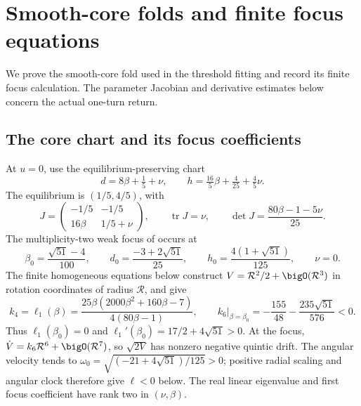 \section{Smooth-core folds and finite focus equations}
\label{app:harvesting-fold}

We prove the smooth-core fold used in the threshold fitting and record
its finite focus calculation. The parameter Jacobian and derivative
estimates below concern the actual one-turn return.

\subsection{The core chart and its focus coefficients}

At \(u=0\), use the equilibrium-preserving chart
\begin{equation}\label{eq:harvesting:core-chart}
 d=8\beta+\tfrac15+\nu,\qquad
 h=\tfrac{16}{5}\beta+\tfrac4{25}+\tfrac45\nu.
\end{equation}
The equilibrium is \((1/5,4/5)\), with
\[
 J=\begin{pmatrix}-1/5&-1/5\\16\beta&1/5+\nu\end{pmatrix},
 \qquad \operatorname{tr}J=\nu,\qquad
 \det J=\frac{80\beta-1-5\nu}{25}.
\]
The multiplicity-two weak focus of
\cite[Theorem~3.6]{huang2013} occurs at
\begin{equation}\label{eq:harvesting:bautin-point}
 \beta_0=\frac{\sqrt{51}-4}{100},\qquad
 d_0=\frac{-3+2\sqrt{51}}{25},\qquad
 h_0=\frac{4(1+\sqrt{51})}{125},\qquad \nu=0.
\end{equation}
The finite homogeneous equations below construct \(V=\mathcal R^2/2+\bigO(\mathcal R^3)\) in rotation
coordinates of radius \(\mathcal R\), and give
\begin{equation}\label{eq:harvesting:focus-data}
 k_4=\ell_1(\beta)
 =\frac{25\beta(2000\beta^2+160\beta-7)}{4(80\beta-1)},
 \qquad k_6\big|_{\beta=\beta_0}
 =-\frac{155}{48}-\frac{235\sqrt{51}}{576}<0.
\end{equation}
Thus \(\ell_1(\beta_0)=0\) and
\(\ell_1'(\beta_0)=17/2+4\sqrt{51}>0\). At the focus,
\(\dot V=k_6\mathcal R^6+\bigO(\mathcal R^7)\), so
\(\sqrt{2V}\) has nonzero negative quintic drift. The angular
velocity tends to
\(\omega_0=\sqrt{(-21+4\sqrt{51})/125}>0\); positive radial
scaling and angular clock therefore give \(\ell<0\) below.
The real linear eigenvalue and first focus coefficient have rank two
in \((\nu,\beta)\).

